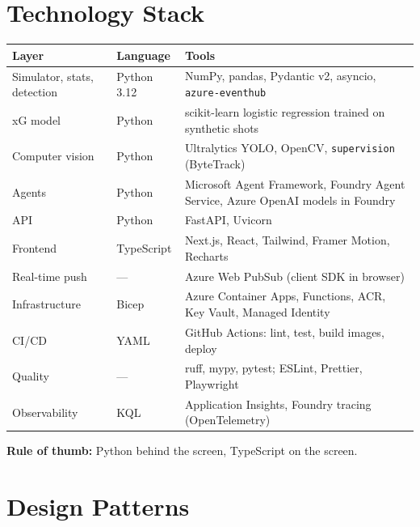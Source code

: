 \documentclass[11pt,a4paper]{article}
\begin{document}
\section{Technology Stack}
\begin{tabularx}{\linewidth}{@{}l l Y@{}}
\toprule
Layer & Language & Tools \\
\midrule
Simulator, stats, detection & Python 3.12 & NumPy, pandas, Pydantic v2, asyncio, \texttt{azure-eventhub} \\
xG model                    & Python & scikit-learn logistic regression trained on synthetic shots \\
Computer vision             & Python & Ultralytics YOLO, OpenCV, \texttt{supervision} (ByteTrack) \\
Agents                      & Python & Microsoft Agent Framework, Foundry Agent Service, Azure OpenAI models in Foundry \\
API                         & Python & FastAPI, Uvicorn \\
Frontend                    & TypeScript & Next.js, React, Tailwind, Framer Motion, Recharts \\
Real-time push              & --- & Azure Web PubSub (client SDK in browser) \\
Infrastructure              & Bicep & Azure Container Apps, Functions, ACR, Key Vault, Managed Identity \\
CI/CD                       & YAML & GitHub Actions: lint, test, build images, deploy \\
Quality                     & --- & ruff, mypy, pytest; ESLint, Prettier, Playwright \\
Observability               & KQL & Application Insights, Foundry tracing (OpenTelemetry) \\
\bottomrule
\end{tabularx}

\medskip
\noindent\textbf{Rule of thumb:} Python behind the screen, TypeScript on the screen.

\section{Design Patterns}
\end{document}
